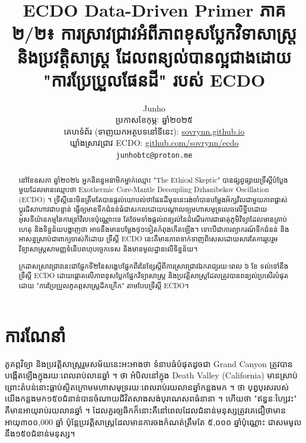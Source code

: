\documentclass[10pt,twocolumn,letterpaper]{article}
\begin{document}
\title{ECDO Data-Driven Primer ភាគ ២/២៖ ការស្រាវជ្រាវអំពីភាពខុសប្លែកវិទាសាស្ត្រនិងប្រវត្តិសាស្ត្រ ដែលពន្យល់បានល្អជាងដោយ "ការប្រែប្រួលផែនដី" របស់ ECDO}

\author{Junho\\
ប្រកាសខែកុម្ភៈ ឆ្នាំ២០២៥\\
គេហទំព័រ (ទាញយកអត្ថបទនៅទីនេះ): \href{https://sovrynn.github.io}{sovrynn.github.io}\\
ឃ្លាំងស្រាវជ្រាវ ECDO: \href{https://github.com/sovrynn/ecdo}{github.com/sovrynn/ecdo}\\
{\tt\small junhobtc@proton.me}
}

\maketitle

\begin{abstract}
នៅខែឧសភា ឆ្នាំ២០២៤ អ្នកនិពន្ធអនាមិកម្នាក់ឈ្មោះ "The Ethical Skeptic" \cite{0} បានផ្សព្វផ្សាយទ្រឹស្ដីបំប្លែងមួយដែលមានឈ្មោះថា Exothermic Core-Mantle Decoupling Dzhanibekov Oscillation (ECDO) \cite{1}។ ទ្រឹស្ដីនេះមិនត្រឹមតែបានផ្តល់យោបល់ថាផែនដីមុននេះរង់ចាំបានបម្លែងអ័ក្សវិលជាមួយភាពផ្លាស់ប្តូរដ៏សាហាវជាបន្ទាន់ ធ្វើឲ្យមានទឹកជំនន់ធំជាសកលដោយបណ្តាលឲ្យមហាសមុទ្រលេចលើទ្វីបដោយអុសទីយ៉ានកម្មនៃការទ្រាំវិលទេប៉ុណ្ណោះទេ តែថែមទាំងផ្ដល់ពន្យល់នៃដំណើរការជាធាតុភូមិវិទ្យាដែលមានគ្រាប់ហេតុ និងទិន្នន័យបង្ហាញថា អាចនឹងមានបម្លែងថ្១ទៀតកំពុងកើតឡើង។ ទោះបីជាការព្យាករណ៍ទឹកជំនន់ និងអាសន្នស្រាប់ជាពាក្យចាស់ក៏ដោយ ទ្រឹស្ដី ECDO នេះគឺមានភាពទាក់ទាញពិសេសដោយសារតែការរួបរួមវិទ្យាសាស្ត្រសាមញ្ញទំនើបពហុបច្ចេកទេស និងមានមូលដ្ឋានលើទិន្នន័យ។

ក្រដាសស្រាវជ្រាវនេះជាផ្នែកទី២នៃសង្ខេបផ្នែកពីរនៃខ្សែស្ដីពីការស្រាវជ្រាវឯករាជ្យរយៈពេល ៦ ខែ \cite{2,20} ទល់ទៅនឹងទ្រឹស្ដី ECDO ដោយផ្តោតលើភាពខុសប្លែកផ្នែកវិទ្យាសាស្ត្រ និងប្រវត្តិសាស្ត្រដែលត្រូវបានពន្យល់ប្រសើរបំផុតដោយ "ការប្រែប្រួលភូគព្ភសាស្ត្រដ៏កក្រើក" តាមបែបទ្រឹស្ដី ECDO។

\end{abstract}

\section{ការណែនាំ}

ភូគព្ភវិទ្យា និងប្រវត្តិសាស្ត្ររួមសម័យនេះអះអាងថា ទំនាបធំបំផុតដូចជា Grand Canyon ត្រូវបានបង្កើតឡើងក្នុងរយៈពេលរាប់លានឆ្នាំ \cite{143}។ ថា អំបិលនៅក្នុង Death Valley (California) មានស្រាប់ព្រោះតំបន់នោះធ្លាប់ស្ថិតក្រោមមហាសមុទ្ររយៈពេលរាប់រយលានឆ្នាំកន្លងមក \cite{144}។ ថា បុព្វបុរសរបស់យើងកន្លងមក១៥០ជំនាន់បានចំណាយជីវិតសាងសង់បុរាណសពធំនានា \cite{29,70}។ ហើយថា "ឥន្ធនៈហ្សៃវះ" គឺមានអាយុរាប់រយលានឆ្នាំ \cite{104}។ ដែលគួរឲ្យឆិកក៏នោះគឺនៅពេលដែលជំនាន់មនុស្សត្រូវគេជឿថាមានអាយុ៣០០,000 ឆ្នាំ \cite{145} ប៉ុន្តែប្រវត្តិសាស្ត្រដែលមានការចងកំណត់ត្រឹមតែ ៥,០០០ ឆ្នាំប៉ុណ្ណោះ ជាសមមូលនឹង១៥០ជំនាន់មនុស្ស។
\end{document}

